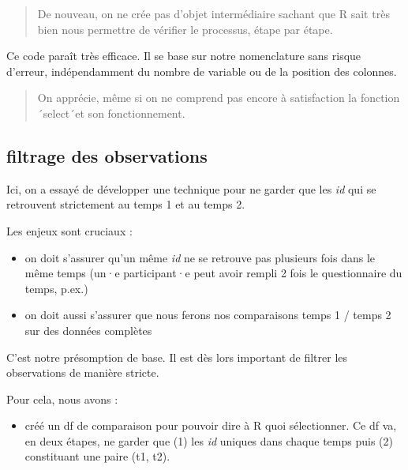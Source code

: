 \documentclass[
  letterpaper,
  DIV=11,
  numbers=noendperiod]{scrreprt}
\providecommand{\tightlist}{%
  \setlength{\itemsep}{0pt}\setlength{\parskip}{0pt}}\usepackage{longtable,booktabs,array}
\begin{document}
\begin{quote}
De nouveau, on ne crée pas d'objet intermédiaire sachant que R sait très
bien nous permettre de vérifier le processus, étape par étape.
\end{quote}

Ce code paraît très efficace. Il se base sur notre nomenclature sans
risque d'erreur, indépendamment du nombre de variable ou de la position
des colonnes.

\begin{quote}
On apprécie, même si on ne comprend pas encore à satisfaction la
fonction ´select´et son fonctionnement.
\end{quote}

\hypertarget{filtrage-des-observations}{%
\subsection{filtrage des observations}\label{filtrage-des-observations}}

Ici, on a essayé de développer une technique pour ne garder que les
\emph{id} qui se retrouvent strictement au temps 1 et au temps 2.

Les enjeux sont cruciaux :

\begin{itemize}
\tightlist
\item
  on doit s'assurer qu'un même \emph{id} ne se retrouve pas plusieurs
  fois dans le même temps (un·e participant·e peut avoir rempli 2 fois
  le questionnaire du temps, p.ex.)
\item
  on doit aussi s'assurer que nous ferons nos comparaisons temps 1 /
  temps 2 sur des données complètes
\end{itemize}

C'est notre présomption de base. Il est dès lors important de filtrer
les observations de manière stricte.

Pour cela, nous avons :

\begin{itemize}
\tightlist
\item
  créé un df de comparaison pour pouvoir dire à R quoi sélectionner. Ce
  df va, en deux étapes, ne garder que (1) les \emph{id} uniques dans
  chaque temps puis (2) constituant une paire (t1, t2).
\end{itemize}
\end{document}

